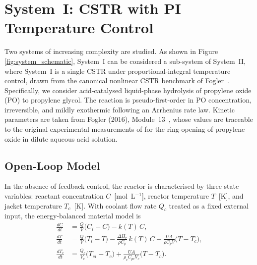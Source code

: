 \documentclass[aps,pre,twocolumn,superscriptaddress,floatfix]{revtex4-2}
\begin{document}
\section {System~I: CSTR with PI Temperature Control}
\label{sec:system1}

Two systems of increasing complexity are studied. As shown in Figure \ref{fig:system_schematic}, System~I can be considered a sub-system of System~II, where System~I is a
single CSTR under proportional-integral temperature control, drawn from the canonical nonlinear CSTR benchmark of
Fogler~\citep{Fogler2016}. 
Specifically, we consider acid-catalysed liquid-phase hydrolysis of
propylene oxide (PO) to propylene glycol.
The reaction is pseudo-first-order in PO concentration, irreversible,
and mildly exothermic following an Arrhenius rate law.
Kinetic parameters are taken from Fogler
(2016), Module~13~\citep{Fogler2016}, whose values are traceable to the
original experimental measurements of \citet{Furusawa1969} for the
ring-opening of propylene oxide in dilute aqueous acid solution. 
%

\subsection{Open-Loop Model}
\label{sec:open_loop}

In the absence of feedback control, the reactor is characterised by
three state variables: reactant concentration $C$~[mol~L$^{-1}$],
reactor temperature $T$~[K], and jacket temperature $T_c$~[K].  With
coolant flow rate $Q_c$ treated as a fixed external input, the
energy-balanced material model is
%
\begin{subequations}
\label{eq:open_loop}
\begin{align}
  \frac{dC}{dt}
    &= \frac{Q}{V}\bigl(C_i - C\bigr)
       - k(T)\,C,
  \label{eq:dC_ol} \\[4pt]
  \frac{dT}{dt}
    &= \frac{Q}{V}\bigl(T_i - T\bigr)
       - \frac{\Delta H_r}{\rho C_p}\,k(T)\,C
       - \frac{U\!A}{\rho C_p V}\bigl(T - T_c\bigr),
  \label{eq:dT_ol} \\[4pt]
  \frac{dT_c}{dt}
    &= \frac{Q_c}{V_c}\bigl(T_{ci} - T_c\bigr)
       + \frac{U\!A}{\rho_c C_{pc} V_c}\bigl(T - T_c\bigr).
  \label{eq:dTc_ol}
\end{align}
\end{subequations}
%
\end{document}
